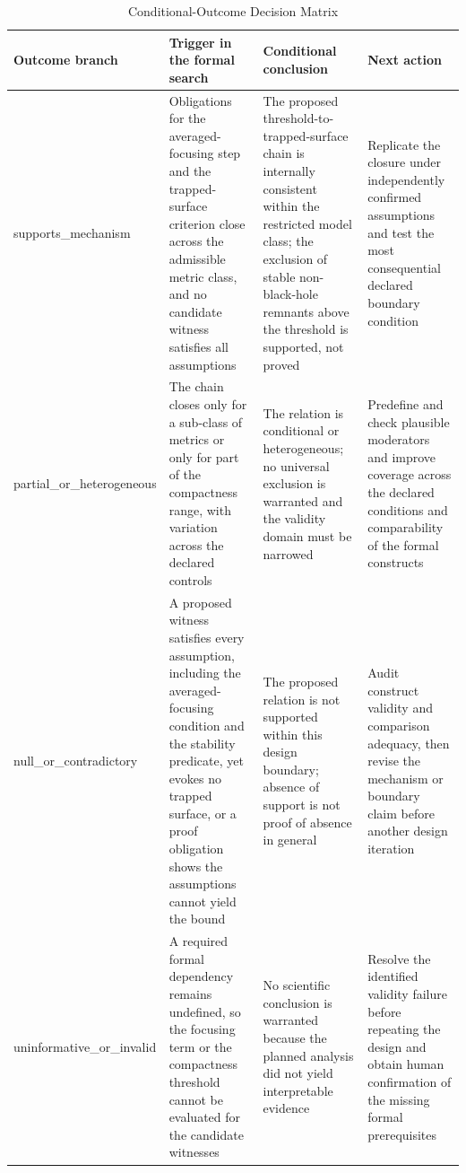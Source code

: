 \documentclass[conference]{IEEEtran}
\begin{document}
\begin{table}[htbp]
\centering
\footnotesize
\setlength{\tabcolsep}{3pt}
\renewcommand{\arraystretch}{1.12}
\caption{Conditional-Outcome Decision Matrix}
\label{tab:expected-outcomes-eo-4}
\begin{tabular}{|p{}|p{}|p{}|p{}|}
\hline
Outcome branch & Trigger in the formal search & Conditional conclusion & Next action \\\hline
supports\_mechanism & Obligations for the averaged-focusing step and the trapped-surface criterion close across the admissible metric class, and no candidate witness satisfies all assumptions & The proposed threshold-to-trapped-surface chain is internally consistent within the restricted model class; the exclusion of stable non-black-hole remnants above the threshold is supported, not proved & Replicate the closure under independently confirmed assumptions and test the most consequential declared boundary condition \\\hline
partial\_or\_heterogeneous & The chain closes only for a sub-class of metrics or only for part of the compactness range, with variation across the declared controls & The relation is conditional or heterogeneous; no universal exclusion is warranted and the validity domain must be narrowed & Predefine and check plausible moderators and improve coverage across the declared conditions and comparability of the formal constructs \\\hline
null\_or\_contradictory & A proposed witness satisfies every assumption, including the averaged-focusing condition and the stability predicate, yet evokes no trapped surface, or a proof obligation shows the assumptions cannot yield the bound & The proposed relation is not supported within this design boundary; absence of support is not proof of absence in general & Audit construct validity and comparison adequacy, then revise the mechanism or boundary claim before another design iteration \\\hline
uninformative\_or\_invalid & A required formal dependency remains undefined, so the focusing term or the compactness threshold cannot be evaluated for the candidate witnesses & No scientific conclusion is warranted because the planned analysis did not yield interpretable evidence & Resolve the identified validity failure before repeating the design and obtain human confirmation of the missing formal prerequisites \\\hline
\end{tabular}
\end{table}
\end{document}
